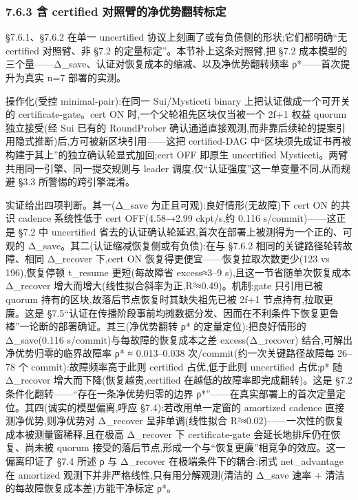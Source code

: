 \documentclass[UTF8,fontset=windows,a4paper,11pt]{ctexart}
\begin{document}
\subsubsection{7.6.3 含 certified
对照臂的净优势翻转标定}\label{ux542b-certified-ux5bf9ux7167ux81c2ux7684ux51c0ux4f18ux52bfux7ffbux8f6cux6807ux5b9a}

§7.6.1、§7.6.2 在单一 uncertified
协议上刻画了或有负债侧的形状;它们都明确``无 certified 对照臂、非 §7.2
的定量标定''。本节补上这条对照臂,把 §7.2
成本模型的三个量------Δ\_save、认证对恢复成本的缩减、以及净优势翻转频率
ρ*------首次提升为真实 n=7 部署的实测。

操作化(受控 minimal-pair):在同一 Sui/Mysticeti binary
上把认证做成一个可开关的 certificate-gate。cert ON
时,一个父轮祖先区块仅当被一个 2f+1 权益 quorum 独立接受(经 Sui 已有的
RoundProber
确认通道直接观测,而非靠后续轮的提案引用隐式推断)后,方可被新区块引用------这把
certified-DAG
中``区块须先成证书再被构建于其上''的独立确认轮显式加回;cert OFF 即原生
uncertified Mysticeti。两臂共用同一引擎、同一提交规则与 leader
调度,仅``认证强度''这一单变量不同,从而规避 §3.3 所警惕的跨引擎混淆。

实证给出四项判断。其一(Δ\_save 为正且可观):良好情形(无故障)下 cert ON
的共识 cadence 系统性低于 cert OFF(4.58→2.99 ckpt/s,约 0.116
s/commit)------这正是 §7.2 中 uncertified
省去的认证确认轮延迟,首次在部署上被测得为一个正的、可观的
Δ\_save。其二(认证缩减恢复侧或有负债):在与 §7.6.2
相同的关键路径轮转故障、相同 Δ\_recover 下,cert ON
恢复得更便宜------恢复拉取次数更少(123 vs 196),恢复停顿 t\_resume
更短(每故障省 excess≈3--9 s),且这一节省随单次恢复成本 Δ\_recover
增大而增大(线性拟合斜率为正,R²≈0.49)。机制:gate 只引用已被 quorum
持有的区块,故落后节点恢复时其缺失祖先已被 2f+1 节点持有,拉取更廉。这是
§7.5``认证在传播阶段事前均摊数据分发、因而在不利条件下恢复更鲁棒''一论断的部署确证。其三(净优势翻转
ρ* 的定量定位):把良好情形的 Δ\_save(0.116
s/commit)与每故障的恢复成本之差 excess(Δ\_recover)
结合,可解出净优势归零的临界故障率 ρ* ≈ 0.013--0.038
次/commit(约一次关键路径故障每 26--78 个 commit):故障频率高于此则
certified 占优,低于此则 uncertified 占优;ρ* 随 Δ\_recover
增大而下降(恢复越贵,certified 在越低的故障率即完成翻转)。这是 §7.2
条件化翻转------``存在一条净优势归零的边界
ρ*''------在真实部署上的首次定量定位。其四(诚实的模型偏离,呼应
§7.4):若改用单一定窗的 amortized cadence 直接测净优势,则净优势对
Δ\_recover 呈非单调(线性拟合
R²≈0.02)------一次性的恢复成本被测量窗稀释,且在极高 Δ\_recover 下
certificate-gate 会延长地排斥仍在恢复、尚未被 quorum
接受的落后节点,形成一个与``恢复更廉''相竞争的效应。这一偏离印证了 §7.4
所述 ρ 与 Δ\_recover 在极端条件下的耦合:闭式 net\_advantage 在 amortized
观测下并非严格线性,只有用分解观测(清洁的 Δ\_save 速率 +
清洁的每故障恢复成本差)方能干净标定 ρ*。
\end{document}
